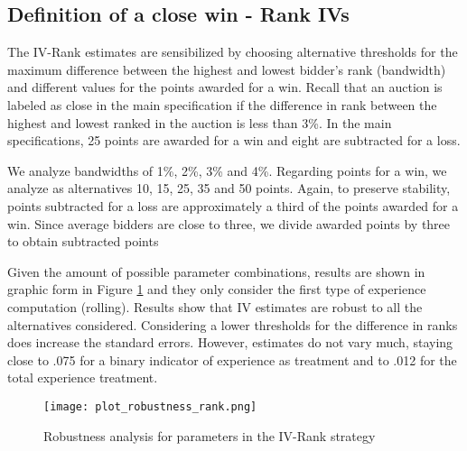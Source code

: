 

\subsection{Definition of a close win - Rank IVs}
The IV-Rank estimates are sensibilized by choosing alternative thresholds for the maximum difference between the highest and lowest bidder's rank (bandwidth) and different values for the points awarded for a win. Recall that an auction is labeled as close in the main specification if the difference in rank between the highest and lowest ranked in the auction is less than 3\%. In the main specifications, 25 points are awarded for a win and eight are subtracted for a loss.

We analyze bandwidths of 1\%, 2\%, 3\% and 4\%. Regarding points for a win, we analyze as alternatives 10, 15, 25, 35 and 50 points. Again, to preserve stability, points subtracted for a loss are approximately a third of the points awarded for a win. Since average bidders are close to three, we divide awarded points by three to obtain subtracted points

Given the amount of possible parameter combinations, results are shown in graphic form in Figure \ref{fig:plot_robustness_rank} and they only consider the first type of experience computation (rolling). Results show that IV estimates are robust to all the alternatives considered. Considering a lower thresholds for the difference in ranks does increase the standard errors. However, estimates do not vary much, staying close to .075 for a binary indicator of experience as treatment and to .012 for the total experience treatment.

\begin{figure}[h]
  \texttt{[image: plot\_robustness\_rank.png]}
  \caption{Robustness analysis for parameters in the IV-Rank strategy}
  \label{fig:plot_robustness_rank}
\end{figure}

